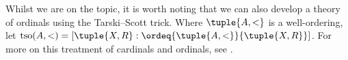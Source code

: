 \documentclass[../../../include/open-logic-section]{subfiles}
\begin{document}
Whilst we are on the topic, it is worth noting that we can also develop a theory of ordinals using the Tarski--Scott trick. Where $\tuple{A, <}$ is a well-ordering, let $\text{tso}(A, <) = [\tuple{X, R} : \ordeq{\tuple{A, <}}{\tuple{X, R}}]$. For more on this treatment of cardinals and ordinals, see \citet[chs.\ 9--12]{Potter2004}.
\end{document}
